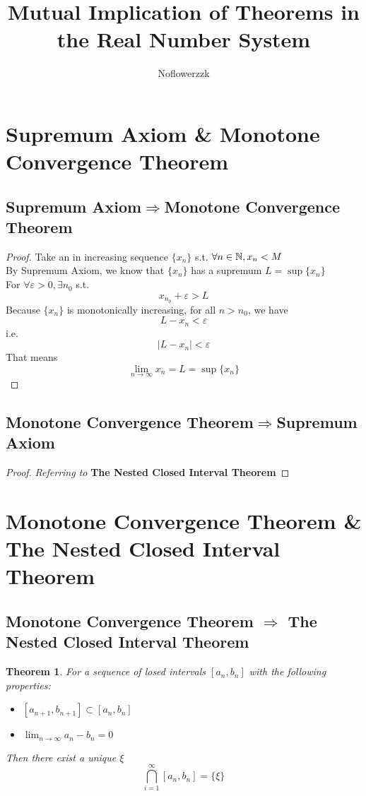 \documentclass{article}
\title{Mutual Implication of Theorems in the Real Number System}
\author{Noflowerzzk}
\date{}
\newtheorem{theorem}{Theorem}   %
\begin{document}
\maketitle

\section{Supremum Axiom \& Monotone Convergence Theorem}
\subsection{Supremum Axiom$\Rightarrow$Monotone Convergence Theorem}

\begin{proof}
    Take an in increasing sequence $\{ x_n \} $ s.t. $\forall n\in \mathbb{N}\*, x_n < M$ \\
    By Supremum Axiom, we know that $\{ x_n \}$ has a supremum $L = \sup {\{x_n\}}$ \\
    For $\forall \varepsilon > 0, \exists n_0 $ s.t.
    $$ x_{n_0} + \varepsilon > L $$ 
    Because $\{x_n\}$ is monotonically increasing, for all $n > n_0$, we have
    $$ L - x_n < \varepsilon $$
    i.e.
    $$ \left\lvert L - x_n\right\rvert < \varepsilon $$
    That means
    $$ \lim_{n \to \infty} x_n = L = \sup{\{x_n\}} $$
    \qedhere
\end{proof}

\subsection{Monotone Convergence Theorem$\Rightarrow$Supremum Axiom}

\begin{proof}
    \textit{Referring to} 
    \textbf{The Nested Closed Interval Theorem}
\end{proof}

\section{Monotone Convergence Theorem \& The Nested Closed Interval Theorem}

\subsection{Monotone Convergence Theorem $\Rightarrow$ The Nested Closed Interval Theorem}

\begin{theorem}
    For a sequence of losed intervals $[a_n, b_n]$ with the following properties:
    \begin{itemize}
        \item[(1)] $\displaystyle{ [a_{n + 1}, b_{n + 1}] \subset [a_n, b_n] }$
        \item[(2)] $\displaystyle{ \lim_{n \to \infty} a_n -b_n = 0 }$ 
    \end{itemize}
    Then there exist a unique $\xi$
    $$\bigcap_{i = 1}^{\infty}[a_n, b_n] = \{\xi\}$$
\end{theorem}
\end{document}
